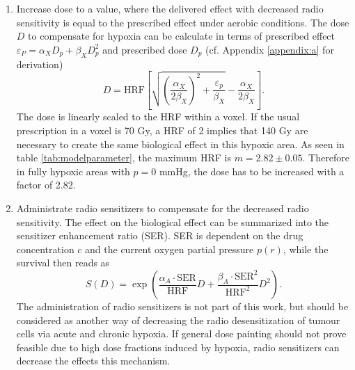 \begin{enumerate}
\item Increase dose to a value, where the delivered effect with decreased radio sensitivity is equal to the prescribed effect under aerobic conditions. The dose $D$ to compensate for hypoxia can be calculate in terms of prescribed effect $\varepsilon_P = \alpha_XD_p + \beta_XD_p^2$ and prescribed dose $D_p$ (cf. Appendix \ref{appendix:a} for derivation)
\begin{equation}\label{eq:dosecompensation}
D = \mathrm{HRF}\left[\sqrt{\left(\frac{\alpha_X}{2\beta_X}\right)^2 + \frac{\varepsilon_p}{\beta_X}}-\frac{\alpha_X}{2\beta_X}\right].
\end{equation}
The dose is linearly scaled to the HRF within a voxel. If the usual prescription in a voxel is 70 Gy, a HRF of 2 implies that 140 Gy are necessary to create the same biological effect in this hypoxic area. As seen in table \ref{tab:modelparameter}, the maximum HRF is $m=2.82\pm 0.05$. Therefore in fully hypoxic areas with $p=0$ mmHg, the dose has to be increased with a factor of 2.82.
\item Administrate radio sensitizers to compensate for the decreased radio sensitivity. The effect on the biological effect can be summarized into the sensitizer enhancement ratio (SER). SER is dependent on the drug concentration $c$ and the current oxygen partial pressure $p(r)$, while the survival then reads as \cite{pmid21183291}
\begin{equation}
S(D) = \exp\left(\frac{\alpha_A\cdot\mathrm{SER}}{\mathrm{HRF}}D + \frac{\beta_A\cdot\mathrm{SER}^2}{\mathrm{HRF}^2}D^2\right).
\end{equation}
The administration of radio sensitizers is not part of this work, but should be considered as another way of decreasing the radio desensitization of tumour cells via acute and chronic hypoxia. If general dose painting should not prove feasible due to high dose fractions induced by hypoxia, radio sensitizers can decrease the effects this mechanism.
\end{enumerate}
